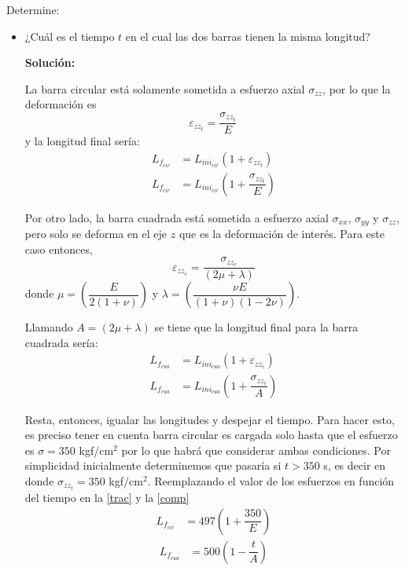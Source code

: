 \documentclass[../notas medios.tex]{subfiles}
\begin{document}
Determine: 
\begin{itemize}
\item ¿Cuál es el tiempo $t$ en el cual las dos barras tienen la misma longitud? 
	
\textbf{Solución:}
	
La barra circular está solamente sometida a esfuerzo axial $\sigma_{zz}$, por lo que la deformación es	
\[\varepsilon _{zz_t} = \dfrac{\sigma_{zz_t} }{E}\, \] 
y la longitud final sería: 
\begin{equation}
  \begin{split}
  L_{f_{cir}} & = L_{ini_{cir}} (1 +  \varepsilon_{zz_t} )\\
  L_{f_{cir}} & = L_{ini_{cir}} \left(1+  \dfrac{\sigma_{zz_t} }{E}\right)
  \end{split}
  \label{trac}
\end{equation}
	
Por otro lado, la barra cuadrada está sometida a esfuerzo axial $\sigma_{xx}$, $\sigma_{yy}$ y $\sigma_{zz}$, pero solo se deforma en el eje $z$ que es la deformación de interés. Para este caso entonces,	
\[\varepsilon _{zz_c} = \dfrac{\sigma_{zz_c} }{(2 \mu + \lambda)}\]
donde $\mu =   \left(\dfrac{E }{2(1 + \nu)}\right)$  y $\lambda =   \left(\dfrac{\nu{E} }{(1 + \nu) (1 - 2\nu)}\right)$. 

Llamando $A = (2 \mu + \lambda)$ se tiene que la longitud final para la barra cuadrada sería: 
\begin{equation}
  \begin{split}
  L_{f_{cua}} & = L_{ini_{cua}} (1 +  \varepsilon_{zz_c}) \\
  L_{f_{cua}} & = L_{ini_{cua}} \left(1 +  \dfrac{\sigma_{zz_c} }{A}\right)
  \end{split}
\label{comp}
\end{equation}
	
Resta, entonces, igualar las longitudes y despejar el tiempo. Para hacer esto, es preciso tener en cuenta barra circular es cargada solo hasta que el esfuerzo es $\sigma=350$ kgf/cm$^2$ por lo que habrá que considerar ambas condiciones. Por simplicidad inicialmente determinemos que pasaría si $t > 350$ s, es decir en donde $\sigma_{zz_t} = 350$  kgf/cm$^2$. Reemplazando el valor de los esfuerzos en función del tiempo en la \cref {trac} y la  \cref{comp}
\begin{equation}
  \begin{split}
  L_{f_{cir}} & = 497 \left(1 +  \dfrac{350 }{E}\right)
  \end{split}
  \label{trac2}
\end{equation}	
\begin{equation}
  \begin{split}
  L_{f_{cua}} & = 500 \left(1 - \dfrac{t }{A}\right)
  \end{split}
  \label{comp2}
\end{equation}


\end{itemize}
\end{document}

